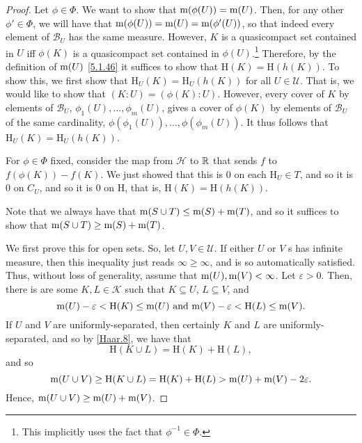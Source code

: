 \begin{thm}
\begin{proof}
Let $\phi \in \Phi$.  We want to show that $\mathrm{m} (\phi (U))=\mathrm{m} (U)$.  Then, for any other $\phi '\in \Phi$, we will have that $\mathrm{m} (\phi (U))=\mathrm{m} (U)=\mathrm{m} (\phi '(U))$, so that indeed every element of $\mathcal{B}_U$ has the same measure.  However, $K$ is a quasicompact set contained in $U$ iff $\phi (K)$ is a quasicompact set contained in $\phi (U)$.\footnote{This implicitly uses the fact that $\phi ^{-1}\in \Phi$.}  Therefore, by the definition of $\mathrm{m} (U)$ \eqref{5.1.46} it suffices to show that $\mathrm{H}(K)=\mathrm{H}(h(K))$.  To show this, we first show that $\mathrm{H}_U(K)=\mathrm{H}_U(h(K))$ for all $U\in \mathcal{U}$.  That is, we would like to show that $(K:U)=(\phi (K):U)$.  However, every cover of $K$ by elements of $\mathcal{B}_U$, $\phi _1(U),\ldots ,\phi _m(U)$, gives a cover of $\phi (K)$ by elements of $\mathcal{B}_U$ of the same cardinality, $\phi (\phi _1(U)),\ldots ,\phi (\phi _m(U))$.  It thus follows that $\mathrm{H}_U(K)=\mathrm{H}_U(h(K))$.

For $\phi \in \Phi$ fixed, consider the map from $\mathcal{H}$ to $\mathbb{R}$ that sends $f$ to $f(\phi (K))-f(K)$.  We just showed that this is $0$ on each $\mathrm{H}_U\in T$, and so it is $0$ on $C_U$, and so it is $0$ on $\mathrm{H}$, that is, $\mathrm{H}(K)=\mathrm{H}(h(K))$.

Note that we always have that $\mathrm{m} (S\cup T)\leq \mathrm{m} (S)+\mathrm{m} (T)$, and so it suffices to show that $\mathrm{m} (S\cup T)\geq \mathrm{m} (S)+\mathrm{m} (T)$.

We first prove this for open sets.  So, let $U,V\in \mathcal{U}$.  If either $U$ or $V$ s has infinite measure, then this inequality just reads $\infty \geq \infty$, and is so automatically satisfied.  Thus, without loss of generality, assume that $\mathrm{m} (U),\mathrm{m} (V)<\infty$.  Let $\varepsilon >0$.  Then, there is are some $K,L\in \mathcal{K}$ such that $K\subseteq U$, $L\subseteq V$, and
\begin{equation}
\mathrm{m} (U)-\varepsilon <\mathrm{H}(K)\leq \mathrm{m} (U)\text{ and }\mathrm{m} (V)-\varepsilon <\mathrm{H}(L)\leq \mathrm{m} (V).
\end{equation}
If $U$ and $V$ are uniformly-separated, then certainly $K$ and $L$ are uniformly-separated, and so by \cref{Haar.8}, we have that
\begin{equation}
\mathrm{H}(K\cup L)=\mathrm{H}(K)+\mathrm{H}(L),
\end{equation}
and so
\begin{equation}
\mathrm{m} (U\cup V)\geq \mathrm{H}(K\cup L)=\mathrm{H}(K)+\mathrm{H}(L)>\mathrm{m} (U)+\mathrm{m} (V)-2\varepsilon .
\end{equation}
Hence, $\mathrm{m} (U\cup V)\geq \mathrm{m} (U)+\mathrm{m} (V)$.


\end{proof}
\end{thm}
